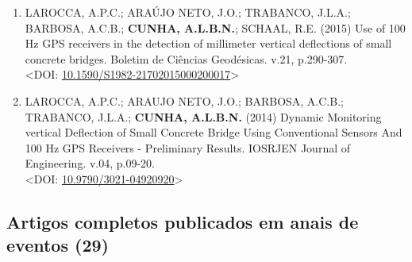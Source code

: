 \documentclass[
  brazilian,
  11pt,
  a4paper,
]{article}
\begin{document}
\begin{enumerate}
\item
  LAROCCA, A.P.C.; ARAÚJO NETO, J.O.; TRABANCO, J.L.A.; BARBOSA, A.C.B.;
  \textbf{CUNHA, A.L.B.N.}; SCHAAL, R.E. (2015) Use of 100 Hz GPS
  receivers in the detection of millimeter vertical deflections of small
  concrete bridges. Boletim de Ciências Geodésicas. v.21, p.290-307.\\
  \textless DOI:
  \href{https://doi.org/10.1590/S1982-21702015000200017}{10.1590/S1982-21702015000200017}\textgreater{}
\item
  LAROCCA, A.P.C.; ARAUJO NETO, J.O.; BARBOSA, A.C.B.; TRABANCO, J.L.A.;
  \textbf{CUNHA, A.L.B.N.} (2014) Dynamic Monitoring vertical Deflection
  of Small Concrete Bridge Using Conventional Sensors And 100 Hz GPS
  Receivers - Preliminary Results. IOSRJEN Journal of Engineering. v.04,
  p.09-20.\\
  \textless DOI:
  \href{https://doi.org/10.9790/3021-04920920}{10.9790/3021-04920920}\textgreater{}
\end{enumerate}

\subsection{Artigos completos publicados em anais de eventos
(29)}\label{artigos-completos-publicados-em-anais-de-eventos-29}
\end{document}

